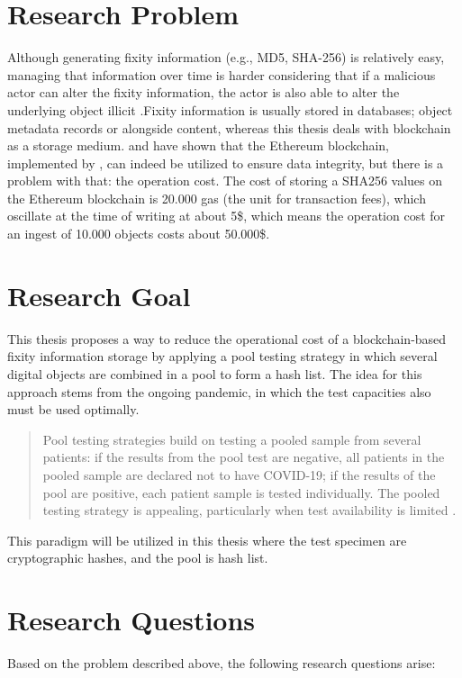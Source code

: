 \section{Research Problem}
Although generating fixity information (e.g., MD5, SHA-256) is relatively easy, managing that information over time is harder considering that if a malicious actor can alter the fixity information, the actor is also able to alter the underlying object illicit \cite[35]{kirschenbaum2010digital}.Fixity information is usually stored in databases; object metadata records or alongside content, whereas this thesis deals with blockchain as a storage medium. \cite{collomosse2018archangel} and \cite{Sigwart2020} have shown that the Ethereum blockchain, implemented by \cite{buterin2013ethereum}, can indeed be utilized to ensure data integrity, but there is a problem with that: the operation cost. The cost of storing a SHA256 values on the Ethereum blockchain is 20.000 gas (the unit for transaction fees), which oscillate at the time of writing at about 5\$, which means the operation cost for an ingest of 10.000 objects costs about 50.000\$.

\section{Research Goal}
This thesis proposes a way to reduce the operational cost of a blockchain-based fixity information storage by applying a pool testing strategy in which several digital objects are combined in a pool to form a hash list. The idea for this approach stems from the ongoing pandemic, in which the test capacities also must be used optimally.
\begin{quote}
Pool testing strategies build on testing a pooled sample from several patients: if the results from the pool test are negative, all patients in the pooled sample are declared not to have COVID-19; if the results of the pool are positive, each patient sample is tested individually. The pooled testing strategy is appealing, particularly when test availability is limited \cite[1]{cherif2020simulation}.
\end{quote}
This paradigm will be utilized in this thesis where the test specimen are cryptographic hashes, and the pool is hash list.

\section{Research Questions}
Based on the problem described above, the following research questions arise:

